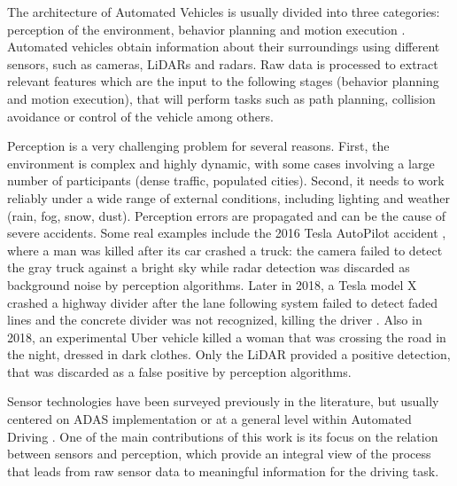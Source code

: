 \documentclass[journal]{IEEEtran}
\begin{document}
The architecture of Automated Vehicles is usually divided into three 
categories: perception of the environment, behavior planning and motion 
execution \cite{behere2015functional}. Automated 
vehicles obtain information about their surroundings using different
sensors, such as cameras, LiDARs and radars. Raw data is processed to extract
relevant features which are the input to the following stages (behavior
planning and motion execution), that will perform tasks such as path planning,
collision avoidance or control of the vehicle among others. 

Perception is a very challenging problem for several
reasons. First, the environment is complex and highly dynamic, with some cases
involving a large number of participants (dense traffic, populated cities). 
Second, it needs to work reliably under a wide range of external conditions, 
including lighting and weather (rain, fog, snow, dust). 
Perception errors are propagated and can be the cause of severe accidents. 
Some real examples include the 2016 Tesla AutoPilot accident \cite{NTSB2017},
where a man was killed after its car crashed a truck: 
the camera failed to detect the gray truck against a bright sky while radar
detection was discarded as background noise by perception algorithms.
Later in 2018, a Tesla model X crashed a highway divider after the lane
following system failed to detect faded lines and the concrete divider was not
recognized, killing the driver \cite{NTSB2018a}.
Also in 2018, an experimental Uber vehicle killed a woman that was
crossing the road \cite{NTSB2018} in the night, dressed in dark clothes. 
Only the LiDAR provided a positive detection, that was discarded as a false
positive by perception algorithms.

Sensor technologies have been surveyed previously in the literature, 
but usually centered on ADAS implementation \cite{Yenkanchi2016,Ziebinski2016a} 
or at a general level within Automated Driving \cite{Pendleton2017}. 
One of the main contributions of this work is its focus on the relation between 
sensors and perception, which provide an integral view of the process that 
leads from raw sensor data to meaningful information for the driving task.
\end{document}
